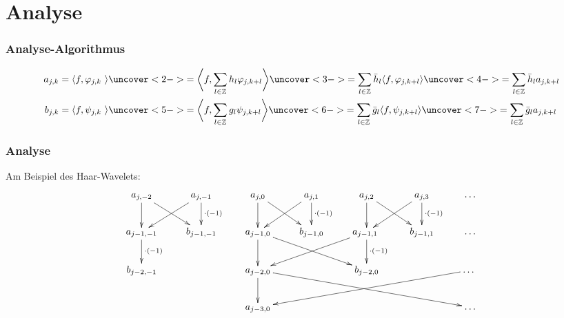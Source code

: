 %
%
%
\section{Analyse}

\begin{frame}
\frametitle{Analyse-Algorithmus}
\begin{align*}
a_{j,k} 
=
\langle f,\varphi_{j,k} \rangle
&\uncover<2->{=
\biggl\langle
f,\sum_{l\in\mathbb Z} h_l\varphi_{j,k+l}
\biggr\rangle}
\uncover<3->{=
\sum_{l\in\mathbb Z} \bar{h}_l\langle f, \varphi_{j,k+l}\rangle}
\uncover<4->{=
\sum_{l\in\mathbb Z} \bar{h}_la_{j,k+l}}
\\
b_{j,k} 
=
\langle f,\psi_{j,k} \rangle
&\uncover<5->{=
\biggl\langle
f,\sum_{l\in\mathbb Z} g_l\psi_{j,k+l}
\biggr\rangle}
\uncover<6->{=
\sum_{l\in\mathbb Z} \bar{g}_l\langle f, \psi_{j,k+l}\rangle}
\uncover<7->{=
\sum_{l\in\mathbb Z} \bar{g}_l a_{j,k+l}}
\end{align*}
\end{frame}

\begin{frame}
\frametitle{Analyse}
Am Beispiel des Haar-Wavelets:
\[
\xymatrix{
a_{j,-2} \ar[d] \ar[dr]
	&a_{j,-1} {\color{red}\ar[d]^{\cdot (-1)}} \ar[dl]
		&a_{j,0} \ar[d] \ar[dr]
			&a_{j,1} {\color{red}\ar[d]^{\cdot (-1)}} \ar[dl]
				&a_{j,2} \ar[d] \ar[dr]
					&a_{j,3} {\color{red}\ar[d]^{\cdot (-1)}} \ar[dl]
						&\dots
\\
a_{j-1,-1} {\color{red}\ar[d]^{\cdot(-1)}}
	&b_{j-1,-1}
		&a_{j-1,0}\ar[d] \ar[drr]
			&b_{j-1,0}
				&a_{j-1,1} {\color{red}\ar[d]^{\cdot (-1)}} \ar[dll]
					&b_{j-1,1}
						&\dots
\\
b_{j-2,-1} 
	&
		&a_{j-2,0} \ar[d] \ar[drrrr]
			&
				&b_{j-2,0}
					&
						&\dots \ar[dllll]
\\
	&
		&a_{j-3,0}
			&
				&
					&
						&\dots
}
\]
\end{frame}

